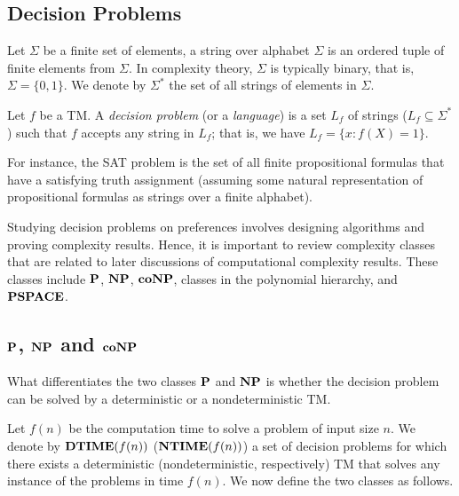 \subsection{Decision Problems}
Let $\Sigma$ be a finite set of elements, a string over alphabet $\Sigma$
is an ordered tuple of finite elements from $\Sigma$. In complexity theory,
$\Sigma$ is typically binary, that is, $\Sigma=\{0,1\}$.
We denote by $\Sigma^*$ the set of all strings of elements in $\Sigma$.

\begin{definition}
	Let $f$ be a TM.
	A \textit{decision problem} (or a \textit{language}) is a set 
	$L_f$ of strings ($L_f \subseteq \Sigma^*$) such that $f$ accepts
	any string in $L_f$; that is, we have $L_f=\{x:f(X)=1\}$.
\end{definition}
For instance, the SAT problem is the set of all finite propositional
formulas that have a satisfying truth assignment (assuming some natural
representation of propositional formulas as strings over a finite alphabet).

Studying decision problems on preferences involves designing algorithms and
proving complexity results.  Hence, it is important to review complexity classes
that are related to later discussions of computational complexity results.
These classes include $\textbf{P}$, $\textbf{NP}$, $\textbf{coNP}$, classes in the polynomial
hierarchy, and $\textbf{PSPACE}$.


\subsection{$\textbf{P}$, $\textbf{NP}$ and $\textbf{coNP}$}
What differentiates the two classes $\textbf{P}$ and $\textbf{NP}$ is whether the decision problem
can be solved by a deterministic or a nondeterministic TM. \cite{Arora:Comput}

Let $f(n)$ be the computation time to solve a problem of input size $n$.
We denote by $\textbf{DTIME}(f(n))$ ($\textbf{NTIME}(f(n))$) a set of decision problems 
for which there exists a deterministic (nondeterministic, respectively) TM
that solves any instance of the problems in time $f(n)$.
We now define the two classes as follows.

